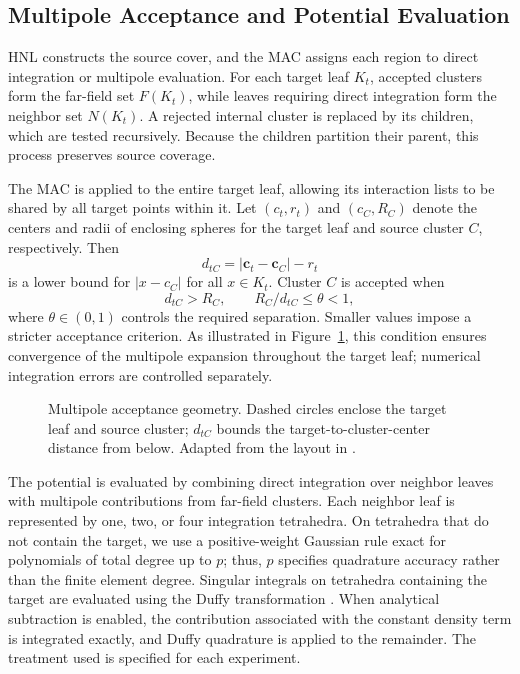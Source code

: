 \documentclass[a4paper,pdflatex,sn-mathphys-num]{sn-jnl}
\theoremstyle{thmstyleone}
\begin{document}
\subsection{Multipole Acceptance and Potential Evaluation}
\label{sec:mac}
\label{sec:hartree_evaluation}

HNL constructs the source cover, and the MAC assigns each region to direct integration or multipole evaluation. For each target leaf \(K_t\), accepted clusters form the far-field set \(F(K_t)\), while leaves requiring direct integration form the neighbor set \(N(K_t)\). A rejected internal cluster is replaced by its children, which are tested recursively. Because the children partition their parent, this process preserves source coverage.

The MAC is applied to the entire target leaf, allowing its interaction lists to be shared by all target points within it. Let \((c_t,r_t)\) and \((c_C,R_C)\) denote the centers and radii of enclosing spheres for the target leaf and source cluster \(C\), respectively. Then
\begin{equation}
d_{tC}=|\mathbf c_t-\mathbf c_C|-r_t
\label{eq:target_cluster_distance}
\end{equation}
is a lower bound for \(|x-c_C|\) for all \(x\in K_t\). Cluster \(C\) is accepted when
\begin{equation}
d_{tC}>R_C,\qquad R_C/d_{tC}\leq\theta<1,
\label{eq:geometric_mac}
\end{equation}
where \(\theta\in(0,1)\) controls the required separation. Smaller values impose a stricter acceptance criterion. As illustrated in Figure~\ref{fig:mac_geometry}, this condition ensures convergence of the multipole expansion throughout the target leaf; numerical integration errors are controlled separately.

\begin{figure}[!htbp]
\centering
\resizebox{0.67\textwidth}{!}{}
\caption{Multipole acceptance geometry. Dashed circles enclose the target leaf and source cluster; $d_{tC}$ bounds the target-to-cluster-center distance from below. Adapted from the layout in \cite[Fig.~1]{Cui}.}
\label{fig:mac_geometry}
\end{figure}

The potential is evaluated by combining direct integration over neighbor leaves with multipole contributions from far-field clusters. Each neighbor leaf is represented by one, two, or four integration tetrahedra. On tetrahedra that do not contain the target, we use a positive-weight Gaussian rule exact for polynomials of total degree up to $p$; thus, $p$ specifies quadrature accuracy rather than the finite element degree. Singular integrals on tetrahedra containing the target are evaluated using the Duffy transformation \cite{Duffy1982}. When analytical subtraction is enabled, the contribution associated with the constant density term is integrated exactly, and Duffy quadrature is applied to the remainder. The treatment used is specified for each experiment.
\end{document}
